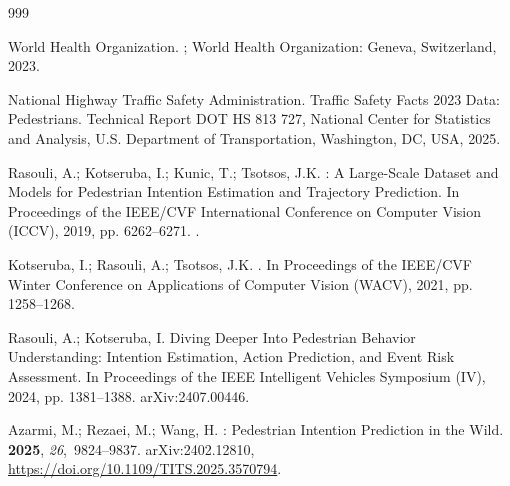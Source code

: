 \documentclass[mti,article,submit,moreauthors]{Definitions/mdpi}
\begin{document}
\begin{thebibliography}{999}

{World Health Organization}.
; World Health
  Organization: Geneva, Switzerland,  2023.

{National Highway Traffic Safety Administration}.
\newblock Traffic Safety Facts 2023 Data: Pedestrians.
\newblock Technical Report DOT HS 813 727, National Center for Statistics and
  Analysis, U.S. Department of Transportation, Washington, DC, USA,  2025.

Rasouli, A.; Kotseruba, I.; Kunic, T.; Tsotsos, J.K.
: A Large-Scale Dataset and Models for Pedestrian Intention
  Estimation and Trajectory Prediction.
\newblock In Proceedings of the IEEE/CVF International Conference on Computer
  Vision (ICCV),  2019, pp. 6262--6271.
.

Kotseruba, I.; Rasouli, A.; Tsotsos, J.K.
.
\newblock In Proceedings of the IEEE/CVF Winter Conference on Applications of
  Computer Vision (WACV),  2021, pp. 1258--1268.

Rasouli, A.; Kotseruba, I.
\newblock Diving Deeper Into Pedestrian Behavior Understanding: Intention
  Estimation, Action Prediction, and Event Risk Assessment.
\newblock In Proceedings of the IEEE Intelligent Vehicles Symposium (IV),
  2024, pp. 1381--1388.
\newblock arXiv:2407.00446.

Azarmi, M.; Rezaei, M.; Wang, H.
: Pedestrian Intention Prediction in the Wild.
 {\bf
  2025}, {\em 26},~9824--9837.
\newblock arXiv:2402.12810, {\url{https://doi.org/10.1109/TITS.2025.3570794}}.


\end{thebibliography}
\end{document}
